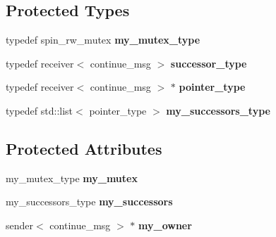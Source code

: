 \subsection*{Protected Types}
\begin{DoxyCompactItemize}
\item 
\hypertarget{classinternal_1_1successor__cache_3_01continue__msg_01_4_adb804eea4bf992c1995e689223dfe52c}{}typedef spin\+\_\+rw\+\_\+mutex {\bfseries my\+\_\+mutex\+\_\+type}\label{classinternal_1_1successor__cache_3_01continue__msg_01_4_adb804eea4bf992c1995e689223dfe52c}

\item 
\hypertarget{classinternal_1_1successor__cache_3_01continue__msg_01_4_a63ca1f3267e2388b74dcd1b747222262}{}typedef receiver$<$ continue\+\_\+msg $>$ {\bfseries successor\+\_\+type}\label{classinternal_1_1successor__cache_3_01continue__msg_01_4_a63ca1f3267e2388b74dcd1b747222262}

\item 
\hypertarget{classinternal_1_1successor__cache_3_01continue__msg_01_4_ac4fc14e83c1f24e69dc88b593d7c052c}{}typedef receiver$<$ continue\+\_\+msg $>$ $\ast$ {\bfseries pointer\+\_\+type}\label{classinternal_1_1successor__cache_3_01continue__msg_01_4_ac4fc14e83c1f24e69dc88b593d7c052c}

\item 
\hypertarget{classinternal_1_1successor__cache_3_01continue__msg_01_4_a8fbf3f6743850e4fdfedf6575f8ba5d6}{}typedef std\+::list$<$ pointer\+\_\+type $>$ {\bfseries my\+\_\+successors\+\_\+type}\label{classinternal_1_1successor__cache_3_01continue__msg_01_4_a8fbf3f6743850e4fdfedf6575f8ba5d6}

\end{DoxyCompactItemize}
\subsection*{Protected Attributes}
\begin{DoxyCompactItemize}
\item 
\hypertarget{classinternal_1_1successor__cache_3_01continue__msg_01_4_a4c06a8a65206b893670654fd7a6ebf68}{}my\+\_\+mutex\+\_\+type {\bfseries my\+\_\+mutex}\label{classinternal_1_1successor__cache_3_01continue__msg_01_4_a4c06a8a65206b893670654fd7a6ebf68}

\item 
\hypertarget{classinternal_1_1successor__cache_3_01continue__msg_01_4_abe0e3f8806b010565ca86e7ef4a13866}{}my\+\_\+successors\+\_\+type {\bfseries my\+\_\+successors}\label{classinternal_1_1successor__cache_3_01continue__msg_01_4_abe0e3f8806b010565ca86e7ef4a13866}

\item 
\hypertarget{classinternal_1_1successor__cache_3_01continue__msg_01_4_a7092ba1fde4807127ad8dc42181118c0}{}sender$<$ continue\+\_\+msg $>$ $\ast$ {\bfseries my\+\_\+owner}\label{classinternal_1_1successor__cache_3_01continue__msg_01_4_a7092ba1fde4807127ad8dc42181118c0}

\end{DoxyCompactItemize}


